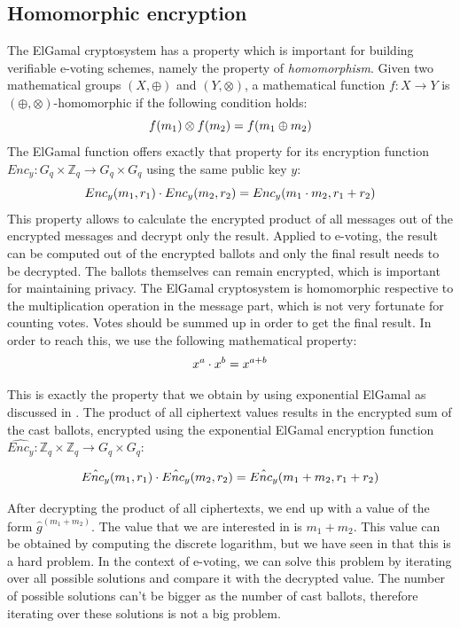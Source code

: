 \documentclass[numbers=noenddot, abstract=on, a4paper, headsepline,
footsepline, oneside, draft=off]{scrreprt}
\begin{document}
\subsection{Homomorphic encryption}
\label{sec:homenc}
The ElGamal cryptosystem has a property
which is important for building verifiable e-voting schemes, namely the property
of \emph{homomorphism}. Given two mathematical groups $(X,\oplus)$ and
$(Y,\otimes)$, a mathematical function $f:X \rightarrow Y$ is $(\oplus, \otimes)$-homomorphic if
the following condition holds:
\begin{equation}
f(m_1) \otimes f(m_2) = f(m_1 \oplus m_2) \notag
\end{equation}
The ElGamal function offers exactly that property for its encryption function
$Enc_y:G_q \times \mathbb{Z}_q \rightarrow G_q \times G_q$ using the same public key $y$:
\begin{equation}
Enc_y(m_1, r_1) \cdot Enc_y(m_2, r_2) = Enc_y(m_1 \cdot m_2, r_1 + r_2)
\notag
\end{equation}
This property allows to calculate the encrypted product of all messages out of
the encrypted messages and decrypt only the result. Applied to e-voting, the
result can be computed out of the encrypted ballots and only the final result
needs to be decrypted. The ballots themselves can remain encrypted, which is
important for maintaining privacy. The ElGamal cryptosystem is homomorphic
respective to the multiplication operation in the message part, which is not
very fortunate for counting votes. Votes should be summed up in order to get the
final result. In order to reach this, we use the following mathematical property:
\begin{equation}
x^a \cdot x^b = x^{a+b} \notag
\end{equation}

This is exactly the property that we obtain by using exponential ElGamal as
discussed in . The product of all ciphertext
values results in the encrypted sum of the cast ballots, encrypted using the
exponential ElGamal encryption function $\hat{Enc_y}:\mathbb{Z}_q \times
\mathbb{Z}_q \rightarrow G_q \times G_q$:

\begin{equation}
\hat{Enc_y}(m_1, r_1) \cdot \hat{Enc_y}(m_2, r_2) = \hat{Enc_y}(m_1 + m_2, r_1 +
r_2)
\notag
\end{equation}

After decrypting the product of all ciphertexts, we end up with a value of the
form $\hat{g}^{(m_1+m_2)}$. The value that we are interested in is $m_1+m_2$.
This value can be obtained by computing the discrete logarithm, but we have seen in
 that this is a hard problem. In the context of
e-voting, we can solve this problem by iterating over all possible solutions and
compare it with the decrypted value. The number of possible solutions can't be
bigger as the number of cast ballots, therefore iterating over these solutions
is not a big problem.
\end{document}
